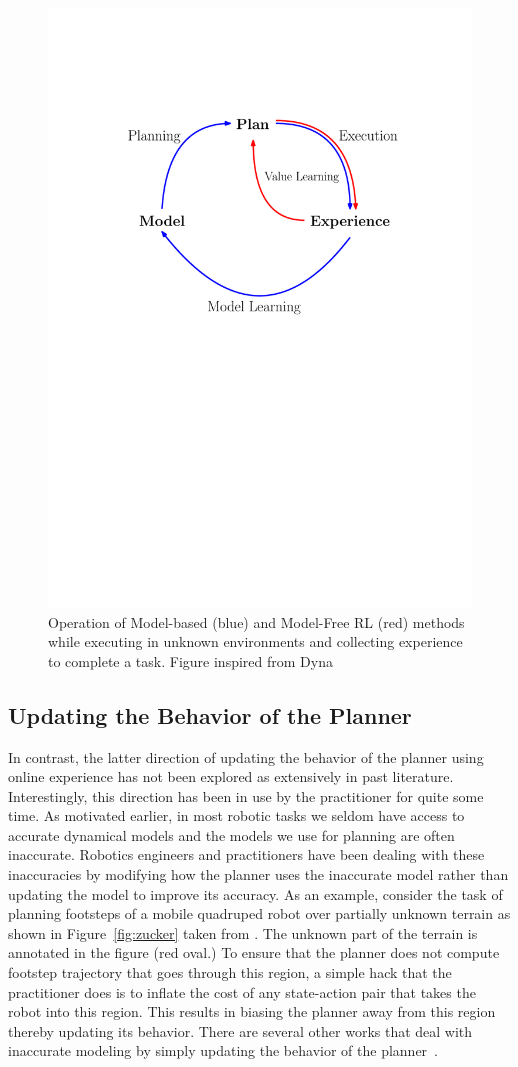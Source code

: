 \begin{figure}[t]
  \centering
  \includegraphics[width=0.5\linewidth]{figures/intro/dyna.pdf}
  \caption{Operation of Model-based (blue) and Model-Free RL (red) methods
    while executing in unknown environments and collecting
    experience to complete a task. Figure inspired from Dyna~\cite{DBLP:journals/sigart/Sutton91}}
  \label{fig:dyna}
\end{figure}

\subsection{Updating the Behavior of the Planner}
\label{sec:updat-behav-plann}


In contrast, the latter direction of updating the behavior of the
planner using online experience has not been explored as extensively
in past literature. Interestingly, this direction has been in use by
the practitioner for quite some time. As motivated earlier, in most
robotic tasks we seldom have access to accurate dynamical models and
the models we use for planning are often inaccurate. Robotics
engineers and practitioners have been dealing with these inaccuracies
by modifying how the planner uses the inaccurate model rather than
updating the model to improve its accuracy. As an example, consider
the task of planning footsteps of a mobile quadruped robot over
partially unknown terrain as shown in Figure~\ref{fig:zucker} taken
from \cite{DBLP:journals/ijrr/ZuckerRSCBAK11}. The
unknown part of the terrain is annotated in the figure (red oval.) To
ensure that the planner does not compute footstep trajectory that goes
through this region, a simple
hack that the practitioner does is to inflate the cost of any
state-action pair that takes the robot into this region. This results
in biasing the planner away from this region thereby updating its
behavior. There are several other works that deal with inaccurate modeling by simply updating the
behavior of the planner~\cite{DBLP:journals/ral/McConachiePMB20,
  DBLP:journals/scirobotics/MitranoMB21, DBLP:journals/ral/PowerB21,
  DBLP:conf/icra/LeeFTRGRF20}.

